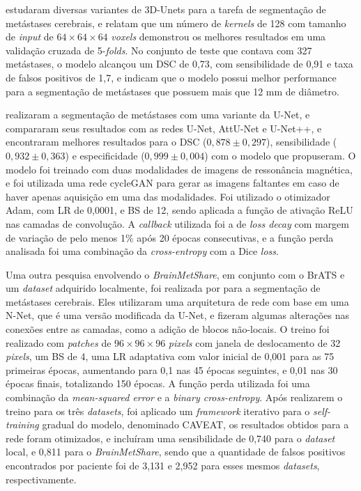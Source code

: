 \cite{Liang:2022} estudaram diversas variantes de 3D-Unets para a tarefa de segmentação de metástases cerebrais, e relatam que um número de \textit{kernels} de 128 com tamanho de \textit{input} de $64\times64\times64$ \textit{voxels} demonstrou os melhores resultados em uma validação cruzada de 5-\textit{folds}. No conjunto de teste que contava com 327 metástases, o modelo alcançou um DSC de 0,73, com sensibilidade de 0,91 e taxa de falsos positivos de 1,7, e indicam que o modelo possui melhor performance para a segmentação de metástases que possuem mais que 12 mm de diâmetro.

\cite{Lyu:2022} realizaram a segmentação de metástases com uma variante da U-Net, e compararam seus resultados com as redes U-Net, AttU-Net e U-Net++, e encontraram melhores resultados para o DSC ($0,878 \pm 0,297$), sensibilidade ($0,932 \pm 0,363$) e especificidade ($0,999 \pm 0,004$) com o modelo que propuseram. O modelo foi treinado com duas modalidades de imagens de ressonância magnética, e foi utilizada uma rede cycleGAN para gerar as imagens faltantes em caso de haver apenas aquisição em uma das modalidades. Foi utilizado o otimizador Adam, com LR de 0,0001, e BS de 12, sendo aplicada a função de ativação ReLU nas camadas de convolução. A \textit{callback} utilizada foi a de \textit{loss decay} com margem de variação de pelo menos 1\% após 20 épocas consecutivas, e a função perda analisada foi uma combinação da \textit{cross-entropy} com a Dice \textit{loss}.


Uma outra pesquisa envolvendo o \textit{BrainMetShare}, em conjunto com o BrATS e um \textit{dataset} adquirido localmente, foi realizada por \cite{Liew:2022} para a segmentação de metástases cerebrais. Eles utilizaram uma arquitetura de rede com base em uma N-Net, que é uma versão modificada da U-Net, e fizeram algumas alterações nas conexões entre as camadas, como a adição de blocos não-locais. O treino foi realizado com \textit{patches} de $96 \times 96 \times 96$ \textit{pixels} com janela de deslocamento de 32 \textit{pixels}, um BS de 4, uma LR adaptativa com valor inicial de 0,001 para as 75 primeiras épocas, aumentando para 0,1 nas 45 épocas seguintes, e 0,01 nas 30 épocas finais, totalizando 150 épocas. A função perda utilizada foi uma combinação da \textit{mean-squared error} e a \textit{binary cross-entropy}. Após realizarem o treino para os três \textit{datasets}, foi aplicado um \textit{framework} iterativo para o \textit{self-training} gradual do modelo, denominado CAVEAT, os resultados obtidos para a rede foram otimizados, e incluíram uma sensibilidade de 0,740 para o \textit{dataset} local, e 0,811 para o \textit{BrainMetShare}, sendo que a quantidade de falsos positivos encontrados por paciente foi de 3,131 e 2,952 para esses mesmos \textit{datasets}, respectivamente.

